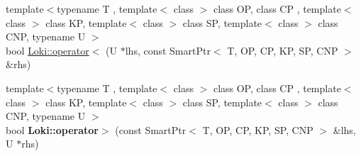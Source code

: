 \begin{DoxyCompactItemize}
\item 
{\footnotesize template$<$typename T , template$<$ class $>$ class O\+P, class C\+P , template$<$ class $>$ class K\+P, template$<$ class $>$ class S\+P, template$<$ class $>$ class C\+N\+P, typename U $>$ }\\bool \hyperlink{group__SmartPointerGroup_ga077391f2d5ea6f967f6c948817fe4378}{Loki\+::operator$<$} (U $\ast$lhs, const Smart\+Ptr$<$ T, O\+P, C\+P, K\+P, S\+P, C\+N\+P $>$ \&rhs)
\item 
\hypertarget{group__SmartPointerGroup_ga0482b2c131ab426526ff9463fda7f2ea}{}{\footnotesize template$<$typename T , template$<$ class $>$ class O\+P, class C\+P , template$<$ class $>$ class K\+P, template$<$ class $>$ class S\+P, template$<$ class $>$ class C\+N\+P, typename U $>$ }\\bool {\bfseries Loki\+::operator$>$} (const Smart\+Ptr$<$ T, O\+P, C\+P, K\+P, S\+P, C\+N\+P $>$ \&lhs, U $\ast$rhs)\label{group__SmartPointerGroup_ga0482b2c131ab426526ff9463fda7f2ea}


\end{DoxyCompactItemize}
